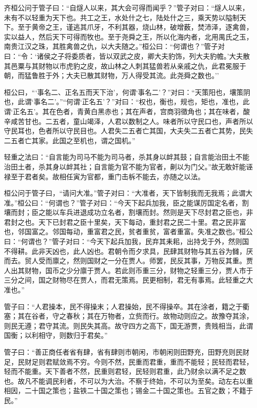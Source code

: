 \documentclass[]{article}
\begin{document}
齐桓公问于管子曰：``自燧人以来，其大会可得而闻乎？''管子对曰：``燧人以来，未有不以轻重为天下也。共工之王，水处什之七，陆处什之三，乘天势以隘制天下。至于黄帝之王，谨逃其爪牙，不利其器，烧山林，破增薮，焚沛泽，逐禽兽，实以益人，然后天下可得而牧也。至于尧舜之王，所以化海内者，北用禺氏之玉，南贵江汉之珠，其胜禽兽之仇，以大夫随之。''桓公曰：``何谓也？''管子对曰：``令：`诸侯之子将委质者，皆以双武之皮，卿大夫豹饰，列大夫豹幨。'大夫散其邑粟与其财物以市虎豹之皮，故山林之人刺其猛兽若从亲戚之仇，此君冕服于朝，而猛鲁胜于外；大夫已散其财物，万人得受其流。此尧舜之数也。''

桓公曰，```事名二、正名五而天下治'，何谓`事名二'？''对曰：``天策阳也，壤策阴也，此谓`事名二'。''``何谓`正名五'？''对曰：``权也，衡也，规也，矩也，准也，此谓`正名五'。其在色者，青黄白黑赤也；其在声者，宫商羽徵角也；其在味者，酸辛咸苦甘也。二五者，童山竭泽，人君以数制之人。味者所以守民口也，声者所以守民耳也，色者所以守民目也。人君失二五者亡其国，大夫失二五者亡其势，民失二五者亡其家。此国之至机也，谓之国机。''

轻重之法曰：``自言能为司马不能为司马者，杀其身以衅其鼓；自言能治田土不能治田土者，杀其身以衅其社；自言能为官不能为官者，劓以为门父。''故无敢奸能诬禄至于君者矣。故相任寅为官都，重门击柝不能去，亦随之以法。

桓公问于管子曰，``请问大准。''管子对曰：``大准者，天下皆制我而无我焉；此谓大准。''桓公曰：``何谓也？''管子对曰：``今天下起兵加我，臣之能谋厉国定名者，割壤而封；臣之能以车兵进退成功立名者，割壤而封。然则是天下尽封君之臣也，非君封之也。天下已封君之臣十里矣，天下每动，重封君之民二十里。君之民非富也，邻国富之。邻国每动，重富君之民，贫者重贫，富者重富。失准之数也。''桓公曰：``何谓也？''管子对曰：``今天下起兵加我，民弃其耒耜，出持戈于外，然则国不得耕。此非天凶也，此人凶也。君朝令而夕求具，民肆其财物与其五谷为雠，厌而去。贸人受而廪之，然则国财之一分在贾人。师罢，民反其事，万物反其重。贾人出其财物，国币之少分廪于贾人。若此则币重三分，财物之轻重三分，贾人市于三分之间，国之财物尽在贾人，而君无策焉。民更相制，君无有事焉。此轻重之大准也。''

管子曰：``人君操本，民不得操末；人君操始，民不得操卒。其在涂者，籍之于衢塞；其在谷者，守之春秋；其在万物者，立赀而行。故物动则应之。故豫夺其涂，则民无遵；君守其流。则民失其高。故守四方之高下，国无游贾，贵贱相当，此谓国衡；以利相守，则数归于君矣。''

管子曰：``善正商任者省有肆，省有肆则市朝闲，市朝闲则田野充，田野充则民财足，民财足则君赋敛焉不穷。今则不然，民重而君重，重而不能轻；民轻而君轻，轻而不能重。天下善者不然，民重则君轻，民轻则君重，此乃财余以满不足之数也。故凡不能调民利者，不可以为大治。不察于终始，不可以为至矣。动左右以重相因，二十国之策也；盐铁二十国之策也；锡金二十国之策也。五官之数；不籍于民。''
\end{document}
